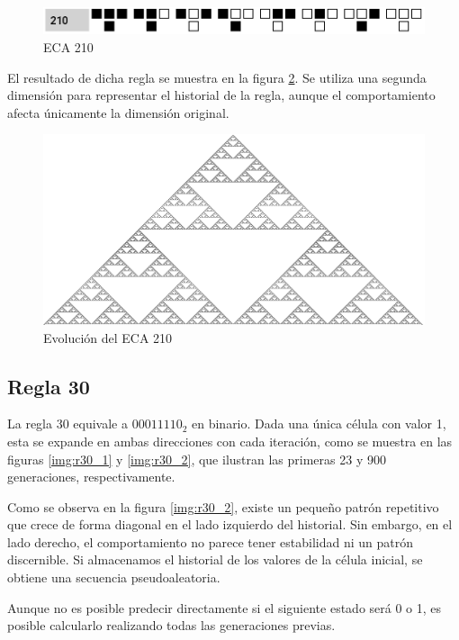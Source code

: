 \documentclass[12pt,twoside]{article}
\begin{document}
	\begin{figure}[H]
		\centering
		\includegraphics[width=\textwidth]{img/eca1.png}
		\caption{ECA 210}
		\label{img:eca1}
	\end{figure}
	
	El resultado de dicha regla se muestra en la figura \ref{img:eca2}. Se utiliza una segunda dimensión para representar el historial de la regla, aunque el comportamiento afecta únicamente la dimensión original.
	
	\begin{figure}[H]
		\centering
		\includegraphics[width=\textwidth]{img/eca2.png}
		\caption{Evolución del ECA 210}
		\label{img:eca2}
	\end{figure}
	
	\subsection{Regla 30}
	
	La regla 30 equivale a $00011110_2$ en binario. Dada una única célula con valor 1, esta se expande en ambas direcciones con cada iteración, como se muestra en las figuras \ref{img:r30_1} y \ref{img:r30_2}, que ilustran las primeras 23 y 900 generaciones, respectivamente.
	
	Como se observa en la figura \ref{img:r30_2}, existe un pequeño patrón repetitivo que crece de forma diagonal en el lado izquierdo del historial. Sin embargo, en el lado derecho, el comportamiento no parece tener estabilidad ni un patrón discernible. Si almacenamos el historial de los valores de la célula inicial, se obtiene una secuencia pseudoaleatoria.
	
	Aunque no es posible predecir directamente si el siguiente estado será 0 o 1, es posible calcularlo realizando todas las generaciones previas.
	
\end{document}
